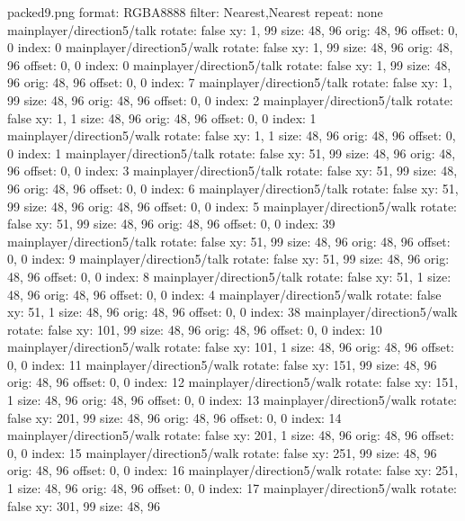packed9.png
format: RGBA8888
filter: Nearest,Nearest
repeat: none
mainplayer/direction5/talk
  rotate: false
  xy: 1, 99
  size: 48, 96
  orig: 48, 96
  offset: 0, 0
  index: 0
mainplayer/direction5/walk
  rotate: false
  xy: 1, 99
  size: 48, 96
  orig: 48, 96
  offset: 0, 0
  index: 0
mainplayer/direction5/talk
  rotate: false
  xy: 1, 99
  size: 48, 96
  orig: 48, 96
  offset: 0, 0
  index: 7
mainplayer/direction5/talk
  rotate: false
  xy: 1, 99
  size: 48, 96
  orig: 48, 96
  offset: 0, 0
  index: 2
mainplayer/direction5/talk
  rotate: false
  xy: 1, 1
  size: 48, 96
  orig: 48, 96
  offset: 0, 0
  index: 1
mainplayer/direction5/walk
  rotate: false
  xy: 1, 1
  size: 48, 96
  orig: 48, 96
  offset: 0, 0
  index: 1
mainplayer/direction5/talk
  rotate: false
  xy: 51, 99
  size: 48, 96
  orig: 48, 96
  offset: 0, 0
  index: 3
mainplayer/direction5/talk
  rotate: false
  xy: 51, 99
  size: 48, 96
  orig: 48, 96
  offset: 0, 0
  index: 6
mainplayer/direction5/talk
  rotate: false
  xy: 51, 99
  size: 48, 96
  orig: 48, 96
  offset: 0, 0
  index: 5
mainplayer/direction5/walk
  rotate: false
  xy: 51, 99
  size: 48, 96
  orig: 48, 96
  offset: 0, 0
  index: 39
mainplayer/direction5/talk
  rotate: false
  xy: 51, 99
  size: 48, 96
  orig: 48, 96
  offset: 0, 0
  index: 9
mainplayer/direction5/talk
  rotate: false
  xy: 51, 99
  size: 48, 96
  orig: 48, 96
  offset: 0, 0
  index: 8
mainplayer/direction5/talk
  rotate: false
  xy: 51, 1
  size: 48, 96
  orig: 48, 96
  offset: 0, 0
  index: 4
mainplayer/direction5/walk
  rotate: false
  xy: 51, 1
  size: 48, 96
  orig: 48, 96
  offset: 0, 0
  index: 38
mainplayer/direction5/walk
  rotate: false
  xy: 101, 99
  size: 48, 96
  orig: 48, 96
  offset: 0, 0
  index: 10
mainplayer/direction5/walk
  rotate: false
  xy: 101, 1
  size: 48, 96
  orig: 48, 96
  offset: 0, 0
  index: 11
mainplayer/direction5/walk
  rotate: false
  xy: 151, 99
  size: 48, 96
  orig: 48, 96
  offset: 0, 0
  index: 12
mainplayer/direction5/walk
  rotate: false
  xy: 151, 1
  size: 48, 96
  orig: 48, 96
  offset: 0, 0
  index: 13
mainplayer/direction5/walk
  rotate: false
  xy: 201, 99
  size: 48, 96
  orig: 48, 96
  offset: 0, 0
  index: 14
mainplayer/direction5/walk
  rotate: false
  xy: 201, 1
  size: 48, 96
  orig: 48, 96
  offset: 0, 0
  index: 15
mainplayer/direction5/walk
  rotate: false
  xy: 251, 99
  size: 48, 96
  orig: 48, 96
  offset: 0, 0
  index: 16
mainplayer/direction5/walk
  rotate: false
  xy: 251, 1
  size: 48, 96
  orig: 48, 96
  offset: 0, 0
  index: 17
mainplayer/direction5/walk
  rotate: false
  xy: 301, 99
  size: 48, 96

